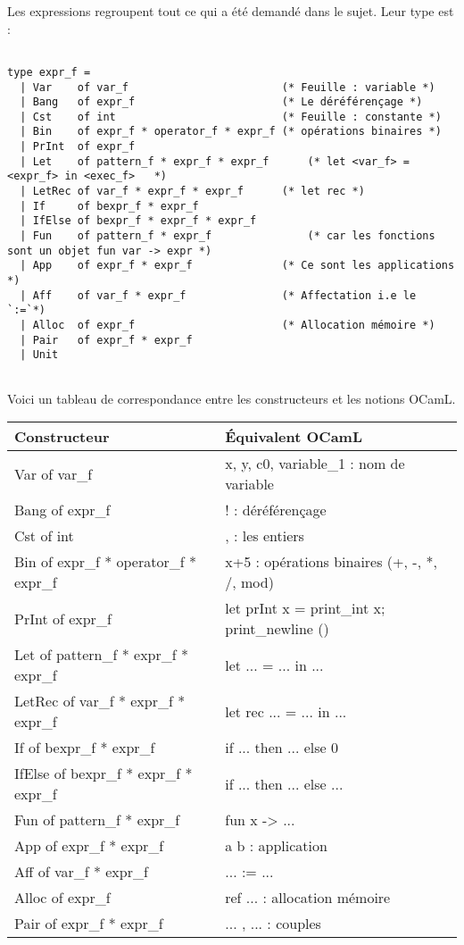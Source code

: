 \documentclass{article}
\newcommand\code[1]{{\fontfamily{lmtt}\selectfont #1}}
\begin{document}
	Les expressions regroupent tout ce qui a été demandé dans le sujet. Leur type est :
	
	\begin{verbatim}
	
type expr_f =
  | Var    of var_f                        (* Feuille : variable *)
  | Bang   of expr_f                       (* Le déréférençage *)
  | Cst    of int                          (* Feuille : constante *)
  | Bin    of expr_f * operator_f * expr_f (* opérations binaires *)
  | PrInt  of expr_f
  | Let    of pattern_f * expr_f * expr_f      (* let <var_f> = <expr_f> in <exec_f>   *)
  | LetRec of var_f * expr_f * expr_f      (* let rec *)
  | If     of bexpr_f * expr_f
  | IfElse of bexpr_f * expr_f * expr_f
  | Fun    of pattern_f * expr_f               (* car les fonctions sont un objet fun var -> expr *)
  | App    of expr_f * expr_f              (* Ce sont les applications *)
  | Aff    of var_f * expr_f               (* Affectation i.e le `:=`*)
  | Alloc  of expr_f                       (* Allocation mémoire *)
  | Pair   of expr_f * expr_f
  | Unit


	\end{verbatim}
	
	\vspace{0.5cm}
	Voici un tableau de correspondance entre les constructeurs et les notions OCamL.
	
	\begin{center}
	\begin{tabular}{l | l}
		Constructeur & Équivalent OCamL \\
		\hline
		\code{Var of var\_f} & \code{x, y, c0, variable\_1} : nom de variable \\
  		\code{Bang of expr\_f} & \code{!} : déréférençage\\
		\code{Cst of int} & \code{0}, \code{1} : les entiers\\
		\code{Bin of expr\_f * operator\_f * expr\_f} & \code{x+5} : opérations binaires (\code{+, -, *, /, mod}) \\
  		\code{PrInt of expr\_f} & \code{let prInt x = print\_int x; print\_newline ()} \\
		\code{Let of pattern\_f * expr\_f * expr\_f} & \code{let ... = ... in ... } \\
		\code{LetRec of var\_f * expr\_f * expr\_f} & \code{let rec ... = ... in ... }\\
		\code{If of bexpr\_f * expr\_f} & \code{if ... then ... else 0} \\
		\code{IfElse of bexpr\_f * expr\_f * expr\_f} & \code{if ... then ... else ...} \\
		\code{Fun of pattern\_f * expr\_f} & \code{fun x -> ... } \\
		\code{App of expr\_f * expr\_f} & \code{ a b } : application \\
		\code{Aff of var\_f * expr\_f} & \code{... := ...} \\
  		\code{Alloc of expr\_f} & \code{ref ...} : allocation mémoire \\
  		\code{Pair of expr\_f * expr\_f} & \code{... , ...} : couples \\ 
	\end{tabular}
	\end{center}
	
\end{document}
